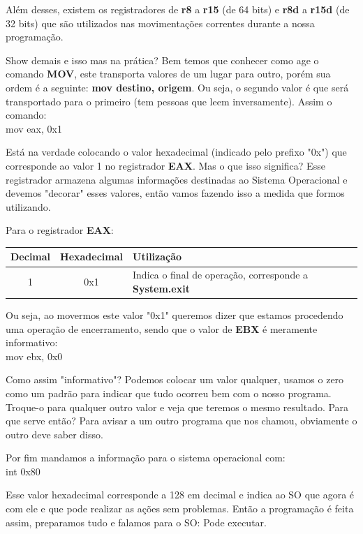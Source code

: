 Além desses, existem os registradores de \textbf{r8} a \textbf{r15} (de 64 bits) e \textbf{r8d} a \textbf{r15d} (de 32 bits) que são utilizados nas movimentações correntes durante a nossa programação.

Show demais e isso mas na prática? Bem temos que conhecer como age o comando \textbf{MOV}, este transporta valores de um lugar para outro, porém sua ordem é a seguinte: \textbf{mov destino, origem}. Ou seja, o segundo valor é que será transportado para o primeiro (tem pessoas que leem inversamente). Assim o comando: \\
{\ttfamily mov eax, 0x1}

Está na verdade colocando o valor hexadecimal (indicado pelo prefixo "0x") que corresponde ao valor 1 no registrador \textbf{EAX}. Mas o que isso significa? Esse registrador armazena algumas informações destinadas ao Sistema Operacional e devemos "decorar" esses valores, então vamos fazendo isso a medida que formos utilizando.

Para o registrador \textbf{EAX}:
\begin{table}[H]
	\centering 
	\begin{tabular}{c | c | l }
		\textbf{Decimal} & \textbf{Hexadecimal} & \textbf{Utilização} \\ \hline 
		1 & 0x1 & Indica o final de operação, corresponde a \textbf{System.exit}
	\end{tabular}
\end{table}

Ou seja, ao movermos este valor "0x1" queremos dizer que estamos procedendo uma operação de encerramento, sendo que o valor de \textbf{EBX} é meramente informativo: \\
{\ttfamily mov ebx, 0x0}

Como assim "informativo"? Podemos colocar um valor qualquer, usamos o zero como um padrão para indicar que tudo ocorreu bem com o nosso programa. Troque-o para qualquer outro valor e veja que teremos o mesmo resultado. Para que serve então? Para avisar a um outro programa que nos chamou, obviamente o outro deve saber disso.

Por fim mandamos a informação para o sistema operacional com: \\
{\ttfamily int 0x80}

Esse valor hexadecimal corresponde a 128 em decimal e indica ao SO que agora é com ele e que pode realizar as ações sem problemas. Então a programação é feita assim, preparamos tudo e falamos para o SO: Pode executar.

